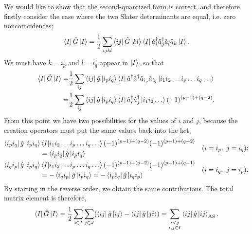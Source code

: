 We would like to show that the second-quantized form is correct, and therefore
firstly consider the case where the two Slater determinants are equal, i.e. zero
noncoincidences;
\begin{equation}
    \bra{I} \hat{G} \ket{I} 
    = \frac{1}{2}\sum_{ijkl} \bra{ij}\hat{G} \ket{kl} 
        \bra{I} \hat{a}^\dagger_i \hat{a}^\dagger_j \hat{a}_l \hat{a}_k \ket{I}.
\end{equation}
We must have $k = i_p$ and $l = i_q$ appear in $\ket{I}$, so that
\begin{equation}
    \begin{aligned}
    \bra{I} \hat{G} \ket{I}
    =& \frac{1}{2}\sum_{ij} \bra{ij}\hat{g}\ket{i_p i_q} 
        \bra{I} \hat{a}^\dagger \hat{a}^\dagger \hat{a}_{i_p} \hat{a}_{i_q}
        \ket{i_1 i_2 \dots i_p \dots i_q \dots} \\
    =& \frac{1}{2}\sum_{ij} \bra{ij} \hat{g}\ket{i_p i_q} 
        \bra{I} \hat{a}^\dagger_i \hat{a}^\dagger_j
        \ket{i_1 i_2 \dots} (-1)^{(p-1) + (q-2)}.
    \end{aligned}
\end{equation}
From this point we have two possibilities for the values of $i$ and $j$, because
the creation operators must put the same values back into the ket,
\begin{align}
    &\begin{aligned}
    \bra{i_p i_q} \hat{g} \ket{i_p i_q} 
        &\braket{I}{i_1 i_2 \dots i_p \dots i_q \dots}
        (-1)^{(p-1) + (q-2)}(-1)^{(p-1) + (q-2)} \\
    &= \bra{i_p i_q} \hat{g} \ket{i_p i_q}
    \end{aligned}
    \quad (i = i_p,\ j = i_q); \\
    &\begin{aligned}
    \bra{i_q i_p} \hat{g} \ket{i_p i_q} 
        &\braket{I}{i_1 i_2 \dots i_p \dots i_q \dots}
        (-1)^{(p-1) + (q-2)}(-1)^{(p-1) + (q-1)} \\
    &= -\bra{i_q i_p} \hat{g} \ket{i_p i_q}
        = -\bra{i_p i_q} \hat{g} \ket{i_q i_p}
    \end{aligned}
    \quad (i = i_q,\ j = i_p).
\end{align}
By starting in the reverse order, we obtain the same contributions. The total matrix
element is therefore,
\begin{equation}
    \bra{I} \hat{G} \ket{I} 
    = \frac{1}{2}\sum_{i \in I} \sum_{j \in J}
        (\bra{ij} \hat{g} \ket{ij} - \bra{ij} \hat{g} \ket{ji})
    = \sum_{\substack{i < j \\ i,j \in I}} \bra{ij} \hat{g} \ket{ij}_{\text{AS}}.
\end{equation}

